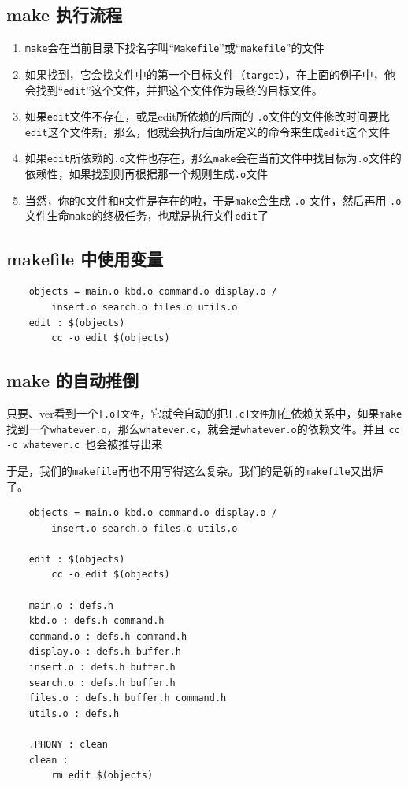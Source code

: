 \documentclass[UTF8,a4paper,12pt]{ctexbook} %
\begin{document}
		\subsection{make 执行流程}
			\begin{enumerate}
				\item \verb|make|会在当前目录下找名字叫“\verb|Makefile|”或“\verb|makefile|”的文件
				\item 如果找到，它会找文件中的第一个目标文件（\verb|target|），在上面的例子中，他会找到“\verb|edit|”这个文件，并把这个文件作为最终的目标文件。
				\item 如果\verb|edit|文件不存在，或是edit所依赖的后面的 \verb|.o|文件的文件修改时间要比\verb|edit|这个文件新，那么，他就会执行后面所定义的命令来生成\verb|edit|这个文件
				\item 如果\verb|edit|所依赖的\verb|.o|文件也存在，那么\verb|make|会在当前文件中找目标为\verb|.o|文件的依赖性，如果找到则再根据那一个规则生成\verb|.o|文件
				\item 当然，你的\verb|C|文件和\verb|H|文件是存在的啦，于是\verb|make|会生成 \verb|.o| 文件，然后再用 \verb|.o |文件生命\verb|make|的终极任务，也就是执行文件\verb|edit|了
			\end{enumerate}
			
		\subsection{makefile 中使用变量}
			\begin{lstlisting}
	objects = main.o kbd.o command.o display.o /
		insert.o search.o files.o utils.o
	edit : $(objects)
		cc -o edit $(objects)
			\end{lstlisting}
		
		\subsection{make 的自动推倒}
			只要、ver看到一个\verb|[.o]文件|，它就会自动的把\verb|[.c]文件|加在依赖关系中，如果\verb|make|找到一个\verb|whatever.o|，那么\verb|whatever.c|，就会是\verb|whatever.o|的依赖文件。并且 \verb|cc -c whatever.c |也会被推导出来
			
			于是，我们的\verb|makefile|再也不用写得这么复杂。我们的是新的\verb|makefile|又出炉了。
			\begin{lstlisting}
	objects = main.o kbd.o command.o display.o /
		insert.o search.o files.o utils.o
		
	edit : $(objects)
		cc -o edit $(objects)
		
	main.o : defs.h
	kbd.o : defs.h command.h
	command.o : defs.h command.h
	display.o : defs.h buffer.h
	insert.o : defs.h buffer.h
	search.o : defs.h buffer.h
	files.o : defs.h buffer.h command.h
	utils.o : defs.h
	
	.PHONY : clean
	clean :
		rm edit $(objects)
			\end{lstlisting}
			
\end{document}
